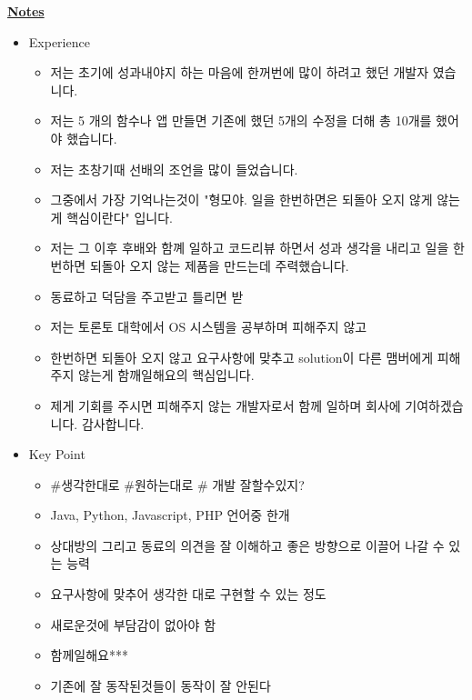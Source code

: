 \documentclass[12pt]{article}
\begin{document}
\underline{\textbf{Notes}}

\begin{itemize}
    \item Experience
    \begin{itemize}
        \item 저는 초기에 성과내야지 하는 마음에 한꺼번에 많이 하려고 했던 개발자 였습니다.
        \item 저는 5 개의 함수나 앱 만들면 기존에 했던 5개의 수정을 더해 총 10개를 했어야 했습니다.
        \item 저는 초창기때 선배의 조언을 많이 들었습니다.
        \item 그중에서 가장 기억나는것이 "형모야. 일을 한번하면은 되돌아 오지 않게 않는게 핵심이란다" 입니다.
        \item 저는 그 이후 후배와 함꼐 일하고 코드리뷰 하면서 성과 생각을 내리고 일을 한번하면 되돌아 오지 않는 제품을 만드는데 주력했습니다.
        \item 동료하고 덕담을 주고받고 틀리면 받
        \item 저는 토론토 대학에서 OS 시스템을 공부하며 피해주지 않고
        \item 한번하면 되돌아 오지 않고 요구사항에 맞추고 solution이 다른 맴버에게 피해 주지 않는게 함깨일해요의 핵심입니다.
        \item 제게 기회를 주시면 피해주지 않는 개발자로서 함께 일하며 회사에 기여하겠습니다. 감사합니다.
    \end{itemize}
    \item Key Point
    \begin{itemize}
        \item \#생각한대로 \#원하는대로 \# 개발 잘할수있지?
        \item Java, Python, Javascript, PHP 언어중 한개
        \item 상대방의 그리고 동료의 의견을 잘 이해하고 좋은 방향으로 이끌어 나갈 수 있는 능력
        \item 요구사항에 맞추어 생각한 대로 구현할 수 있는 정도
        \item 새로운것에 부담감이 없아야 함
        \item 함께일해요***

        \item 기존에 잘 동작된것들이 동작이 잘 안된다


\end{itemize}
\end{itemize}
\end{document}
